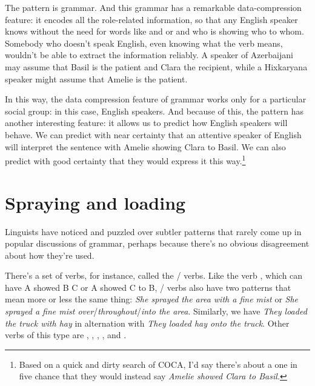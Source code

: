 The pattern is grammar. And this grammar has a remarkable data-compression feature: it encodes all the role-related information, so that any English speaker knows without the need for words like  and  or  and  who is showing who to whom. Somebody who doesn't speak English, even knowing what the verb  means, wouldn't be able to extract the information reliably. A speaker of Azerbaijani may assume that Basil is the patient and Clara the recipient, while a Hixkaryana speaker might assume that Amelie is the patient.

In this way, the data compression feature of grammar works only for a particular social group: in this case, English speakers. And because of this, the pattern has another interesting feature: it allows us to predict how English speakers will behave. We can predict with near certainty that an attentive speaker of English will interpret the sentence with Amelie showing Clara to Basil. We can also predict with good certainty that they would express it this way.\footnote{Based on a quick and dirty search of COCA, I'd say there's about a one in five chance that they would instead say \textit{Amelie showed Clara to Basil.}}

\section{Spraying and loading}

Linguists have noticed and puzzled over subtler patterns that rarely come up in popular discussions of grammar, perhaps because there's no obvious disagreement about how they're used.

There's a set of verbs, for instance, called the / verbs. Like the verb , which can have A showed B C or A showed C to B, / verbs also have two patterns that mean more or less the same thing: \textit{She sprayed the area with a fine mist} or \textit{She sprayed a fine mist over}/\textit{throughout}/\textit{into the area}. Similarly, we have \textit{They loaded the truck with hay} in alternation with \textit{They loaded hay onto the truck}. Other verbs of this type are , , , , and .

